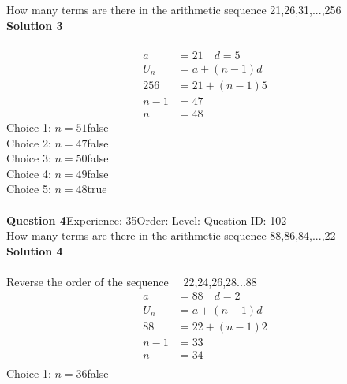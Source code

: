 \documentclass{article}
\begin{document}
How many terms are there in the arithmetic sequence 21,26,31,...,256\\[4pt]
\noindent\textbf{Solution 3}\\[2pt]
\\[-35pt]\begin{align*}
a&=21 \quad d=5\\[2pt]
U_n&=a+(n-1)d\\[2pt]
256&=21+(n-1)5\\[2pt]
n-1&=47\\[2pt]
n&=48
\end{align*}
Choice 1: \hspace{20pt}$n=51$\hspace{20pt}false\\
Choice 2: \hspace{20pt}$n=47$\hspace{20pt}false\\
Choice 3: \hspace{20pt}$n=50$\hspace{20pt}false\\
Choice 4: \hspace{20pt}$n=49$\hspace{20pt}false\\
Choice 5: \hspace{20pt}$n=48$\hspace{20pt}true\\
\\[4pt]
\noindent\textbf{Question 4}\hspace{20pt}Experience: 35\hspace{20pt}Order: \hspace{20pt}Level: \hspace{20pt}Question-ID: 102\\[2pt]
How many terms are there in the arithmetic sequence 88,86,84,...,22\\[4pt]
\noindent\textbf{Solution 4}\\[2pt]
\\[-35pt]Reverse the order of the sequence$\quad$ 22,24,26,28...88
\begin{align*}
a&=88 \quad d=2\\[2pt]
U_n&=a+(n-1)d\\[2pt]
88&=22+(n-1)2\\[2pt]
n-1&=33\\[2pt]
n&=34\\[-100pt]
\end{align*}
Choice 1: \hspace{20pt}$n=36$\hspace{20pt}false\\
\end{document}
